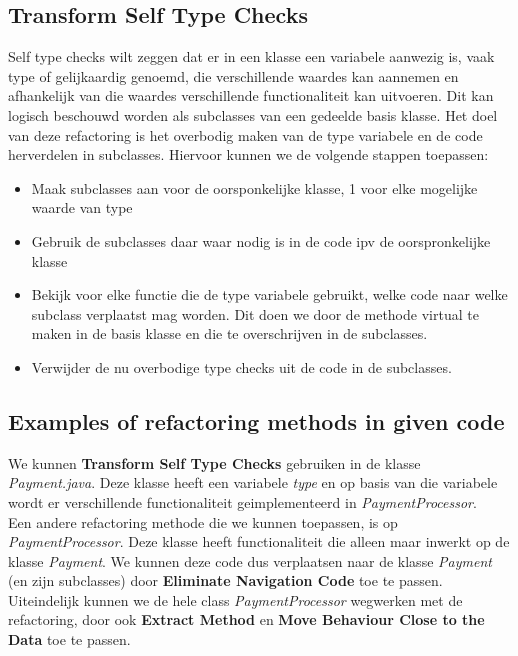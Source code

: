 \documentclass{article}
\begin{document}
\subsection{Transform Self Type Checks}
Self type checks wilt zeggen dat er in een klasse een variabele aanwezig is, vaak type of gelijkaardig genoemd, die verschillende waardes kan aannemen en afhankelijk van die waardes verschillende functionaliteit kan uitvoeren. Dit kan logisch beschouwd worden als subclasses van een gedeelde basis klasse. Het doel van deze refactoring is het overbodig maken van de type variabele en de code herverdelen in subclasses. Hiervoor kunnen we de volgende stappen toepassen:
\begin{itemize}
\item Maak subclasses aan voor de oorsponkelijke klasse, 1 voor elke mogelijke waarde van type
\item Gebruik de subclasses daar waar nodig is in de code ipv de oorspronkelijke klasse
\item Bekijk voor elke functie die de type variabele gebruikt, welke code naar welke subclass verplaatst mag worden. Dit doen we door de methode virtual te maken in de basis klasse en die te overschrijven in de subclasses.
\item Verwijder de nu overbodige type checks uit de code in de subclasses.
\end{itemize}

\subsection{Examples of refactoring methods in given code}
We kunnen \textbf{Transform Self Type Checks} gebruiken in de klasse \textit{Payment.java}. Deze klasse heeft een variabele \textit{type} en op basis van die variabele wordt er verschillende functionaliteit geimplementeerd in \textit{PaymentProcessor}.\\

Een andere refactoring methode die we kunnen toepassen, is op \textit{PaymentProcessor}. Deze klasse heeft functionaliteit die alleen maar inwerkt op de klasse \textit{Payment}. We kunnen deze code dus verplaatsen naar de klasse \textit{Payment}  (en zijn subclasses) door \textbf{Eliminate Navigation Code} toe te passen. \\

Uiteindelijk kunnen we de hele class \textit{PaymentProcessor} wegwerken met de refactoring, door ook \textbf{Extract Method} en \textbf{Move Behaviour Close to the Data} toe te passen.\\
\end{document}
